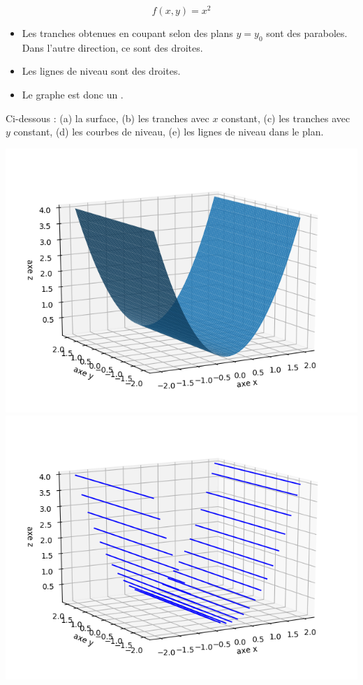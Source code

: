 \begin{exemple}{}{}
	$$f(x,y) = x^2$$
	
	
	
	\begin{itemize}
		\item Les tranches obtenues en coupant selon des plans $y=y_0$ sont des paraboles. Dans l'autre direction, ce sont des droites.
		\item Les lignes de niveau sont des droites.
		\item Le graphe est donc un .
	\end{itemize}
	
	Ci-dessous : (a) la surface, (b) les tranches avec $x$ constant, (c) les tranches avec $y$ constant, (d) les courbes de niveau, (e) les lignes de niveau dans le plan.
	\begin{center}
		\includegraphics[scale=\myscale,scale=0.5]{figures/fonctions-quadra-2a}
		\includegraphics[scale=\myscale,scale=0.5]{figures/fonctions-quadra-2b}

\end{center}
\end{exemple}
